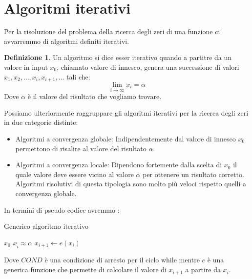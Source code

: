 \documentclass[12pt, a4paper]{book}
\theoremstyle{definition}
\newtheorem{defn}{Definizione}[section]
\begin{document}
\section{Algoritmi iterativi}
\begin{flushleft}
Per la risoluzione del problema della ricerca degli zeri di una funzione ci avvarremmo di algoritmi definiti iterativi.
\begin{defn}
	Un algoritmo si dice esser iterativo quando a partitre da un valore in input $x_{0}$, chiamato valore di innesco,  genera una successione di valori $x_{1},x_{2}, \dots, x_{i},  x_{i+1}, \dots$ tali che:
	\[
		\lim_{i \rightarrow \infty} x_{i} = \alpha
	\]
	Dove $\alpha$ è il valore del risultato che vogliamo trovare.
\end{defn}

Possiamo ulteriormente raggruppare gli algoritmi iterativi per la ricerca degli zeri in due categorie distinte: 
\begin{itemize}
	\item Algoritmi a convergenza globale: Indipendentemente dal valore di innesco $x_{0}$ permettono di risalire al valore del risultato $\alpha$.
	\item Algoritmi a convergenza locale: Dipendono fortemente dalla scelta di $x_{0}$ il quale valore deve essere vicino al valore $\alpha$ per ottenere un risultato corretto.  Algoritmi risolutivi di questa tipologia sono molto più veloci rispetto quelli a convergenza globale.
\end{itemize}

In termini di pseudo codice avremmo : 

\begin{algorithm}
\caption{Generico algoritmo iterativo}
	\begin{algorithmic} 
		\REQUIRE $x_{0}$
		\ENSURE $x_{\hat{i}} \approx \alpha$
		\STATE $ x_{i + 1} \leftarrow  e(x_{i})$
		\ENDWHILE
\end{algorithmic}
\end{algorithm}

Dove  $COND$ è una condizione di arresto per il ciclo while mentre $e$ è una generica funzione che permette di calcolare il valore di $x_{i+1}$ a partire da $x_{i}$.


\end{flushleft}
\end{document}
